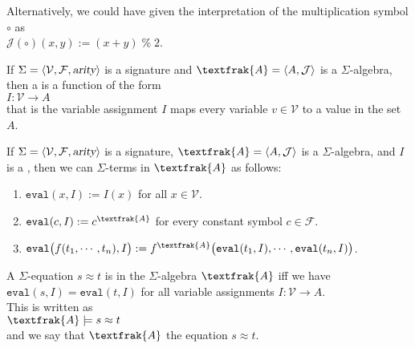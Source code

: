 \remark
Alternatively, we could have given the interpretation of the multiplication symbol $\circ$ as
\\[0.2cm]
\hspace*{1.3cm}
$\mathcal{J}(\circ)(x, y) := (x + y) \;\texttt{\%}\; 2$.

\begin{Definition} \hspace*{\fill} \linebreak
  If $\Sigma = \langle \mathcal{V}, \mathcal{F}, \textsl{arity} \rangle$ is a signature and $\textfrak{A} = \pair(A, \mathcal{J})$ is a $\Sigma$-algebra, then a
   is a function of the form
  \\[0.2cm]
  \hspace*{1.3cm}
  $I: \mathcal{V}  \rightarrow A$
  \\[0.2cm]
  that is the variable assignment $I$ maps every variable $v \in \mathcal{V}$ to a value in the set $A$.
  
\end{Definition}

\begin{Definition} \hspace*{\fill} \linebreak
  If $\Sigma = \langle \mathcal{V}, \mathcal{F}, \textsl{arity} \rangle$ is a signature,
  $\textfrak{A} = \pair(A, \mathcal{J})$ is a $\Sigma$-algebra, and $I$ is a , 
  then we can  $\Sigma$-terms in $\textfrak{A}$ as follows:
  \begin{enumerate}
  \item $\texttt{eval}(x, I) := I(x)$ \quad for all $x \in \mathcal{V}$.
  \item $\texttt{eval}(c, I) := c^\textfrak{A}$ \quad for every constant symbol $c \in \mathcal{F}$.
  \item $\texttt{eval}\bigl(f(t_1,\cdots,t_n), I\bigr) := f^\textfrak{A}\bigl(\texttt{eval}(t_1,I),\cdots,\texttt{eval}(t_n,I)\bigr)$.
  \end{enumerate}
  A $\Sigma$-equation $s \approx t$ is  in the $\Sigma$-algebra $\textfrak{A}$ iff we have
  \\[0.2cm]
  \hspace*{1.3cm}
  $\texttt{eval}(s,I) = \texttt{eval}(t,I)$ for all variable assignments $I:\mathcal{V} \rightarrow A$.
  \\[0.2cm]
  This is written as
  \\[0.2cm]
  \hspace*{1.3cm}
  $\textfrak{A} \models s \approx t$
  \\[0.2cm]
  and we say that $\textfrak{A}$  the equation $s \approx t$.
  \eoxs
\end{Definition}

